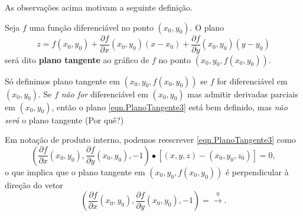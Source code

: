 As observações acima motivam a seguinte definição.

\begin{definition}
    Seja \(f\) uma função diferenciável no ponto \((x_0,y_0)\). O plano
        {\begin{equation}\label{eqn.PlanoTangente3}
            z = f(x_0,y_0) + \frac{\partial f}{\partial x}(x_0,y_0)(x-x_0) + \frac{\partial f}{\partial y}(x_0,y_0)(y-y_0)
        \end{equation}}
    será dito \textbf{plano tangente} ao gráfico de \(f\) no ponto \((x_0,y_0,f(x_0,y_0))\).
\end{definition}

\begin{remark}
    Só definimos plano tangente em \((x_0,y_0,f(x_0,y_0))\) se \(f\) for diferenciável em \((x_0,y_0)\). Se \(f\) \textit{não for} diferenciável em \((x_0,y_0)\) mas admitir derivadas parciais em \((x_0,y_0)\), então o plano \eqref{eqn.PlanoTangente3} está bem definido, mas \textit{não será} o plano tangente (Por quê?)
\end{remark}

Em notação de produto interno, podemos reescrever \eqref{eqn.PlanoTangente3} como \[\left( \frac{\partial f}{\partial x}(x_0,y_0), \frac{\partial f}{\partial y}(x_0,y_0), -1 \right)\bullet\left[ (x,y,z) - (x_0,y_0,z_0) \right] = 0,\] o que implica que o plano tangente em \((x_0,y_0,f(x_0,y_0))\) é perpendicular à direção do vetor \[\left( \frac{\partial f}{\partial x}(x_0,y_0), \frac{\partial f}{\partial y}(x_0,y_0), -1 \right) = \xrightarrow{\eta}.\]

